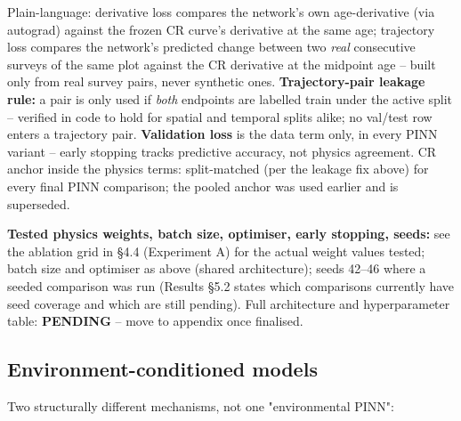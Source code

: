 \documentclass[11pt,a4paper]{report}
\begin{document}
Plain-language: derivative loss compares the network's own age-derivative (via autograd) against
the frozen CR curve's derivative at the same age; trajectory loss compares the network's predicted
change between two \emph{real} consecutive surveys of the same plot against the CR derivative at
the midpoint age -- built only from real survey pairs, never synthetic ones.
\textbf{Trajectory-pair leakage rule:} a pair is only used if \emph{both} endpoints are labelled
train under the active split -- verified in code to hold for spatial and temporal splits alike; no
val/test row enters a trajectory pair.
\textbf{Validation loss} is the data term only, in every PINN variant -- early stopping tracks
predictive accuracy, not physics agreement.
CR anchor inside the physics terms: split-matched (per the leakage fix above) for every final PINN
comparison; the pooled anchor was used earlier and is superseded.

\textbf{Tested physics weights, batch size, optimiser, early stopping, seeds:} see the ablation
grid in \S4.4 (Experiment A) for the actual weight values tested; batch size and optimiser as
above (shared architecture); seeds 42--46 where a seeded comparison was run (Results \S5.2 states
which comparisons currently have seed coverage and which are still pending). Full architecture and
hyperparameter table: \textbf{PENDING} -- move to appendix once finalised.

\subsection*{Environment-conditioned models}

Two structurally different mechanisms, not one "environmental PINN":
\end{document}
